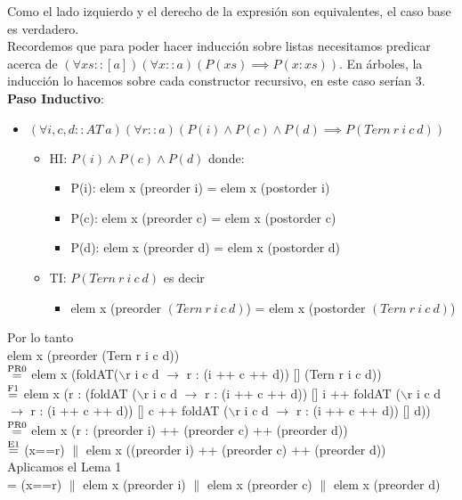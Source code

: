 \documentclass{article}
\begin{document}
Como el lado izquierdo y el derecho de la expresión son equivalentes, el caso base es verdadero. \\
Recordemos que para poder hacer inducción sobre listas necesitamos predicar acerca de $(\forall xs::[a])(\forall x ::a) (P(xs) \implies P(x:xs))$. En árboles, la inducción lo hacemos sobre cada constructor recursivo, en este caso serían 3. \\
\textbf{Paso Inductivo}: 
\begin{itemize}
    \item $(\forall i, c, d:: AT \ a)(\forall r::a)(P(i) \land P(c) \land P(d) \implies P(Tern \ r \ i \ c \ d))$
    \begin{itemize}
        \item HI: $P(i) \land P(c) \land P(d)$ donde: 
        \begin{itemize}
            \item P(i): elem x (preorder i) = elem x (postorder i)
            \item P(c): elem x (preorder c) = elem x (postorder c)
            \item P(d): elem x (preorder d) = elem x (postorder d)
        \end{itemize}
        \item TI: $P(Tern \ r \ i \ c \ d)$ es decir
        \begin{itemize}
        \item elem x (preorder $(Tern \ r \ i \ c \ d)$) = elem x (postorder $(Tern \ r \ i \ c \ d)$)
        \end{itemize}
    \end{itemize}
\end{itemize}
Por lo tanto \\ 
elem x (preorder (Tern r i c d)) \\ 
$\stackrel{\text{PR0}}{=}$ elem x (foldAT($\backslash$r i c d $\rightarrow$ r : (i ++ c ++ d)) [] (Tern r i c d)) \\ 
$\stackrel{\text{F1}}{=}$ elem x (r : (foldAT ($\backslash$r i c d $\rightarrow$ r : (i ++ c ++ d)) [] i ++ foldAT ($\backslash$r i c d $\rightarrow$ r : (i ++ c ++ d)) [] c ++ foldAT ($\backslash$r i c d $\rightarrow$ r : (i ++ c ++ d)) [] d)) \\ 
$\stackrel{\text{PR0}}{=}$ elem x (r : (preorder i) ++ (preorder c) ++ (preorder d)) \\
$\stackrel{\text{E1}}{=}$ (x==r) $\|$ elem x ((preorder i) ++ (preorder c) ++ (preorder d)) \\
Aplicamos el Lema 1 \\
= (x==r) $\|$ elem x (preorder i) $\|$ elem x (preorder c) $\|$ elem x (preorder d) \\
\end{document}
